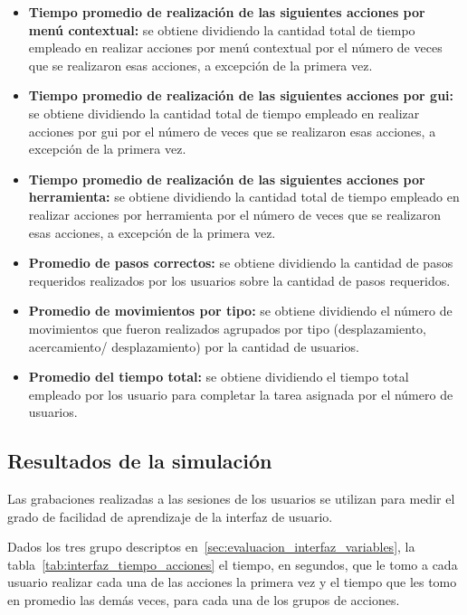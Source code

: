 \begin{itemize}
    
\item \textbf{Tiempo promedio de realización de las siguientes acciones por menú contextual:} 
    se obtiene dividiendo la cantidad total de tiempo empleado en realizar acciones por menú 
    contextual por el número de veces que se realizaron esas acciones, a excepción de la primera 
    vez. 
    
\item \textbf{Tiempo promedio de realización de las siguientes acciones por \Gls{gui}:} 
    se obtiene dividiendo la cantidad total de tiempo empleado en realizar acciones por \Gls{gui} 
    por el número de veces que se realizaron esas acciones, a excepción de la primera 
    vez. 
    
\item \textbf{Tiempo promedio de realización de las siguientes acciones por herramienta:} 
    se obtiene dividiendo la cantidad total de tiempo empleado en realizar acciones por 
    herramienta por el número de veces que se realizaron esas acciones, a excepción de la 
    primera vez. 
    
\item \textbf{Promedio de pasos correctos:} se obtiene dividiendo la cantidad de 
    pasos requeridos realizados por los usuarios sobre la cantidad de pasos requeridos. 
    
\item \textbf{Promedio de movimientos por tipo:} se obtiene dividiendo el número de 
    movimientos que fueron realizados agrupados por tipo (desplazamiento, acercamiento/
    desplazamiento) por la cantidad de usuarios.
    
\item \textbf{Promedio del tiempo total:} se obtiene dividiendo el tiempo total empleado 
    por los usuario para completar la tarea asignada por el número de usuarios.

\end{itemize}

\subsection{Resultados de la simulación}

Las grabaciones realizadas a las sesiones de los usuarios se utilizan para medir
el grado de facilidad de aprendizaje de la interfaz de usuario.

Dados los tres grupo descriptos en~\ref{sec:evaluacion_interfaz_variables}, la
tabla~\ref{tab:interfaz_tiempo_acciones}  el tiempo, en segundos,
que le tomo a cada usuario realizar cada una de las acciones la primera vez y
el tiempo que les tomo en promedio las demás veces, para cada una de los grupos
de acciones.

